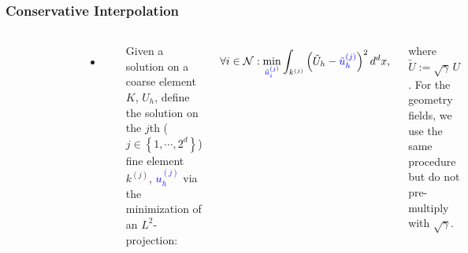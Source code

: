\documentclass{beamer}
\begin{document}
\begin{frame}
\frametitle{Conservative Interpolation}

  \begin{columns}[c]


      \begin{figure}[htb!]
        \centering
        \includegraphics[width=0.9\textwidth]{fig.amrElement.png}
      \end{figure}


      \begin{itemize}
        \item
          \citet{sbc2015}
      \end{itemize}

      Given a solution on a coarse element $K$, $U_{h}$,
      define the solution on the $j$th ($j\in\left\{1,\cdots,2^{d}\right\}$)
      fine element $k^{\left(j\right)}$,
      \textcolor{blue}{$u_{h}^{\left(j\right)}$}
      via the minimization of an $L^{2}$-projection:

      $$\forall i \in \mathcal{N}:
      \min\limits_{\textcolor{blue}{\tilde{u}_{i}^{\left(j\right)}}}
      \int_{k^{\left(j\right)}}\left(\tilde{U}_{h}
      -\textcolor{blue}{\tilde{u}_{h}^{\left(j\right)}}\right)^{2}d^{d}x,$$

      where $\tilde{U} := \sqrt{\gamma} \, U$.
      For the geometry fields, we use the same procedure but do not pre-multiply
      with $\sqrt{\gamma}$.

  \end{columns}

\end{frame}
\end{document}
